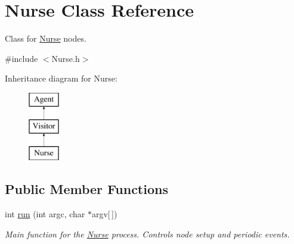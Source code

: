 \hypertarget{classNurse}{\section{Nurse Class Reference}
\label{classNurse}
}


Class for \hyperlink{classNurse}{Nurse} nodes.  




{\ttfamily \#include $<$Nurse.\-h$>$}

Inheritance diagram for Nurse\-:\begin{figure}[H]
\begin{center}
\leavevmode
\includegraphics[height=3.000000cm]{classNurse}
\end{center}
\end{figure}
\subsection*{Public Member Functions}
\begin{DoxyCompactItemize}
\item 
\hypertarget{classNurse_ab58da68573cbe6f62dab9298acfd6ba6}{int \hyperlink{classNurse_ab58da68573cbe6f62dab9298acfd6ba6}{run} (int argc, char $\ast$argv\mbox{[}$\,$\mbox{]})}\label{classNurse_ab58da68573cbe6f62dab9298acfd6ba6}

\begin{DoxyCompactList}\small\item\em Main function for the \hyperlink{classNurse}{Nurse} process. Controls node setup and periodic events. \end{DoxyCompactList}\end{DoxyCompactItemize}
